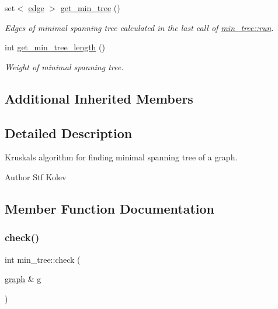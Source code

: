 \begin{DoxyCompactItemize}
set$<$ \mbox{\hyperlink{classedge}{edge}} $>$ \mbox{\hyperlink{classmin__tree_a9feda096e7c32a402fb91702ed3679fc}{get\+\_\+min\+\_\+tree}} ()
\begin{DoxyCompactList}\small\item\em Edges of minimal spanning tree calculated in the last call of \mbox{\hyperlink{classmin__tree_ac025e8dad0db7a6a1e0e7b476b547802}{min\+\_\+tree\+::run}}. \end{DoxyCompactList}\item 
int \mbox{\hyperlink{classmin__tree_a8ca03d32ba55a9eb20b52fcb0e6fa6a5}{get\+\_\+min\+\_\+tree\+\_\+length}} ()
\begin{DoxyCompactList}\small\item\em Weight of minimal spanning tree. \end{DoxyCompactList}\end{DoxyCompactItemize}
\subsection*{Additional Inherited Members}


\subsection{Detailed Description}
Kruskal\textquotesingle{}s algorithm for finding minimal spanning tree of a graph. 

\begin{DoxyAuthor}{Author}
Stf Kolev 
\end{DoxyAuthor}


\subsection{Member Function Documentation}
\mbox{\label{classmin__tree_ad87b1bfbc687ad943c07538fa0c3d270}} 
\subsubsection{\texorpdfstring{check()}{check()}}
{\footnotesize\ttfamily int min\+\_\+tree\+::check (\begin{DoxyParamCaption}\item[{\mbox{\hyperlink{classgraph}{graph}} \&}]{g }\end{DoxyParamCaption})\hspace{0.3cm}{\ttfamily [virtual]}}



